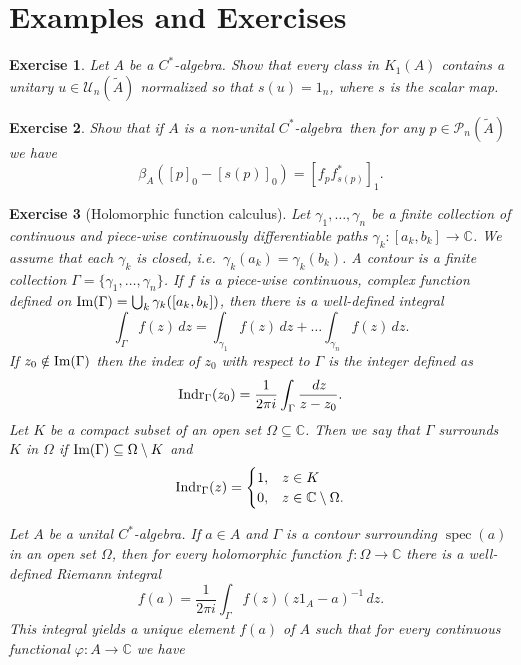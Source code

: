 \documentclass{book}
\newtheorem{exercise}{Exercise}[section]
\def\cstar{\(C^*\)-algebra}
\begin{document}
\section{Examples and Exercises}
\begin{exercise}\label{ex:841}
  Let \(A\) be a \cstar. Show that every class in \(K_1(A)\) contains a unitary \(u\in\mathcal{U}_n(\tilde{A})\)
  normalized so that \(s(u)=1_n\), where \(s\) is the scalar map.
\end{exercise}
\begin{exercise}\label{ex:842}
  Show that if \(A\) is a non-unital \cstar\ then for any \(p\in\mathcal{P}_n(\tilde{A})\) we have
  \[
    \beta_A({[p]}_0-{[s(p)]}_0)={[f_p f_{s(p)}^*]}_1.
  \]
\end{exercise}
\begin{exercise}[Holomorphic function calculus]\label{ex:843}
  Let \(\gamma_1,\ldots,\gamma_n\) be a finite collection of continuous and piece-wise continuously differentiable paths \(\gamma_k:[a_k,b_k]\rightarrow\mathbb{C}\).
  We assume that each \(\gamma_k\) is closed, i.e.\ \(\gamma_k(a_k)=\gamma_k(b_k)\).
  A \textit{contour} is a finite collection \(\Gamma=\{\gamma_1,\ldots,\gamma_n\}\).
  If \(f\) is a piece-wise continuous, complex function defined on \(\textnormal{Im}(\Gamma)=\bigcup_k\gamma_k([a_k,b_k])\), then there is a well-defined integral
  \[
    \int_{\Gamma}f(z) \,dz=\int_{\gamma_1}f(z)\,dz+\ldots\int_{\gamma_n}f(z)\,dz.
  \]
  If \(z_0\notin\textnormal{Im}(\Gamma)\) then the \textit{index} of \(z_0\) with respect to \(\Gamma\) is the integer defined as
  \[
    \textnormal{Indr}_\Gamma(z_0)=\frac{1}{2\pi i}\int_\Gamma \frac{\,dz}{z-z_0}.
  \]
  Let \(K\) be a compact subset of an open set \(\Omega\subseteq\mathbb{C}\). Then we say that \(\Gamma\) \textit{surrounds} \(K\) in \(\Omega\) if
  \(\textnormal{Im}(\Gamma)\subseteq\Omega\setminus K\) and
  \[
    \textnormal{Indr}_\Gamma(z)=\begin{cases}
      1,& z\in K\\
      0, & z\in\mathbb{C}\setminus\Omega.
    \end{cases}
  \]\par
  Let \(A\) be a unital \cstar. If \(a\in A\) and \(\Gamma\) is a contour surrounding \(\operatorname{spec}(a)\) in an open set \(\Omega\),
  then for every holomorphic function \(f:\Omega\rightarrow\mathbb{C}\) there is a well-defined Riemann integral
  \[
    f(a)=\frac{1}{2\pi i}\int_\Gamma f(z){(z1_A-a)}^{-1}\,dz.
  \]
  This integral yields a unique element \(f(a)\) of \(A\) such that for every continuous functional \(\varphi:A\rightarrow\mathbb{C}\) we have

\end{exercise}
\end{document}
